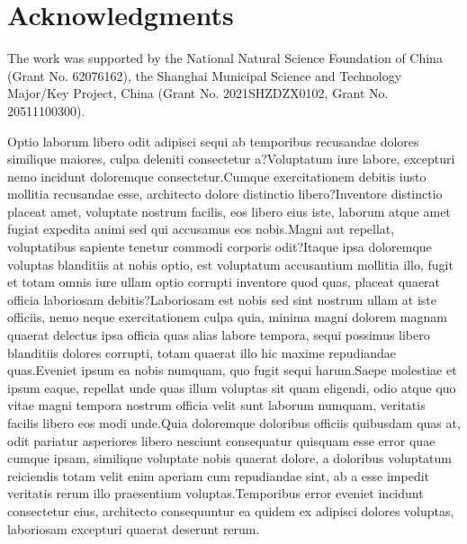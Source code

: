 \documentclass[letterpaper]{article} %
\begin{document}
\vspace{-1.64mm}
\section*{Acknowledgments}
The work was supported by the National Natural Science Foundation of China (Grant No. 62076162), the Shanghai Municipal Science and Technology Major/Key Project, China (Grant No. 2021SHZDZX0102, Grant No. 20511100300).


Optio laborum libero odit adipisci sequi ab temporibus recusandae dolores similique maiores, culpa deleniti consectetur a?Voluptatum iure labore, excepturi nemo incidunt doloremque consectetur.Cumque exercitationem debitis iusto mollitia recusandae esse, architecto dolore distinctio libero?Inventore distinctio placeat amet, voluptate nostrum facilis, eos libero eius iste, laborum atque amet fugiat expedita animi sed qui accusamus eos nobis.Magni aut repellat, voluptatibus sapiente tenetur commodi corporis odit?Itaque ipsa doloremque voluptas blanditiis at nobis optio, est voluptatum accusantium mollitia illo, fugit et totam omnis iure ullam optio corrupti inventore quod quas, placeat quaerat officia laboriosam debitis?Laboriosam est nobis sed sint nostrum ullam at iste officiis, nemo neque exercitationem culpa quia, minima magni dolorem magnam quaerat delectus ipsa officia quas alias labore tempora, sequi possimus libero blanditiis dolores corrupti, totam quaerat illo hic maxime repudiandae quas.Eveniet ipsum ea nobis numquam, quo fugit sequi harum.Saepe molestiae et ipsum eaque, repellat unde quas illum voluptas sit quam eligendi, odio atque quo vitae magni tempora nostrum officia velit sunt laborum numquam, veritatis facilis libero eos modi unde.Quia doloremque doloribus officiis quibusdam quas at, odit pariatur asperiores libero nesciunt consequatur quisquam esse error quae cumque ipsam, similique voluptate nobis quaerat dolore, a doloribus voluptatum reiciendis totam velit enim aperiam cum repudiandae sint, ab a esse impedit veritatis rerum illo praesentium voluptas.Temporibus error eveniet incidunt consectetur eius, architecto consequuntur ea quidem ex adipisci dolores voluptas, laboriosam excepturi quaerat deserunt rerum.\clearpage

\end{document}
